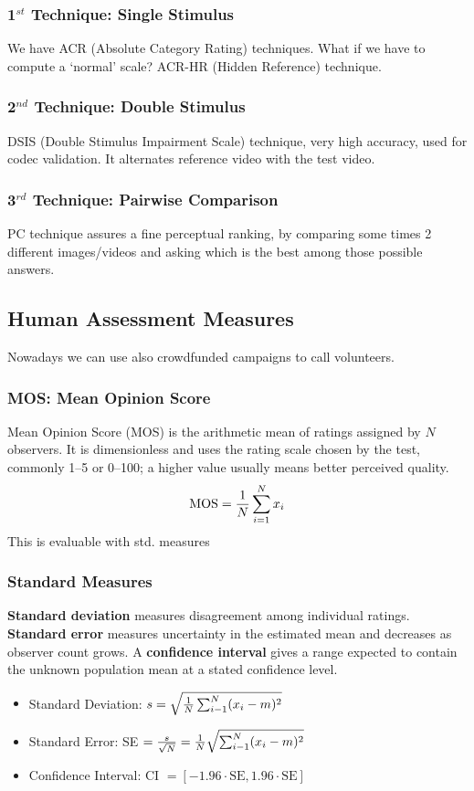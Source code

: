 \subsubsection{1$^{st}$ Technique: Single Stimulus}
We have ACR (Absolute Category Rating) techniques. What if we have to compute a `normal' scale? ACR-HR (Hidden Reference) technique.
\subsubsection{2$^{nd}$ Technique: Double Stimulus}
DSIS (Double Stimulus Impairment Scale) technique, very high accuracy, used for codec validation. It alternates reference video with the test video.
\subsubsection{3$^{rd}$ Technique: Pairwise Comparison}
PC technique assures a fine perceptual ranking, by comparing some times 2 different images/videos and asking which is the best among those possible answers.
\subsection{Human Assessment Measures}
Nowadays we can use also crowdfunded campaigns to call volunteers.
\subsubsection{MOS: Mean Opinion Score}
Mean Opinion Score (MOS) is the arithmetic mean of ratings assigned by $N$ observers. It is dimensionless and uses the rating scale chosen by the test, commonly 1--5 or 0--100; a higher value usually means better perceived quality.
$$\text{MOS} = \frac{1}{N}\sr{N}{i=1} x_i$$
This is evaluable with std. measures
\subsubsection{Standard Measures}
\textbf{Standard deviation} measures disagreement among individual ratings. \textbf{Standard error} measures uncertainty in the estimated mean and decreases as observer count grows. A \textbf{confidence interval} gives a range expected to contain the unknown population mean at a stated confidence level.
\begin{itemize}
    \item Standard Deviation: $s = \sqrt{\frac{1}{N}\sr{N}{i-1}(x_i - m)^2}$
    \item Standard Error: SE $= \frac{s}{\sqrt{N}} = \frac{1}{N}\sqrt{\sr{N}{i-1}(x_i - m)^2}$
    \item Confidence Interval: CI $= [-1.96\cdot \text{SE}, 1.96\cdot \text{SE}]$
\end{itemize}
